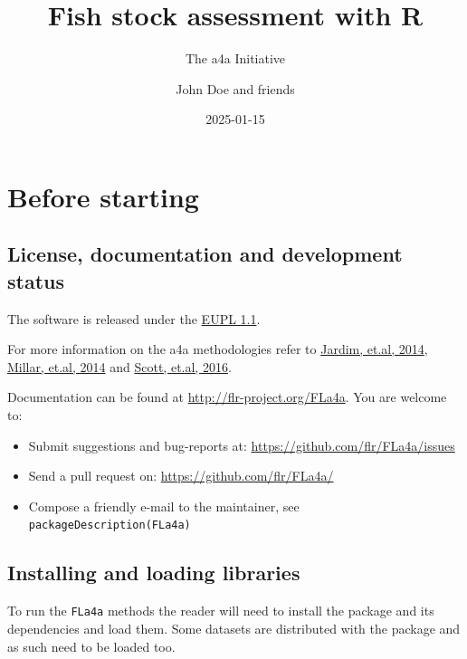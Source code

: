 \documentclass[
]{book}
\title{Fish stock assessment with R}
\subtitle{The a4a Initiative}
\author{John Doe and friends}
\date{2025-01-15}
\providecommand{\tightlist}{%
  \setlength{\itemsep}{0pt}\setlength{\parskip}{0pt}}
\begin{document}
\maketitle

{
\setcounter{tocdepth}{1}
\tableofcontents
}
\hypertarget{before-starting}{%
\chapter{Before starting}\label{before-starting}}

\hypertarget{license-documentation-and-development-status}{%
\section{License, documentation and development status}\label{license-documentation-and-development-status}}

The software is released under the \href{https://joinup.ec.europa.eu/community/eupl/home}{EUPL 1.1}.

For more information on the a4a methodologies refer to \href{http://icesjms.oxfordjournals.org/content/early/2014/04/03/icesjms.fsu050.abstract}{Jardim, et.al, 2014}, \href{http://icesjms.oxfordjournals.org/content/early/2014/03/31/icesjms.fsu043.abstract}{Millar, et.al, 2014} and \href{http://journals.plos.org/plosone/article?id=10.1371/journal.pone.0154922}{Scott, et.al, 2016}.

Documentation can be found at \url{http://flr-project.org/FLa4a}. You are welcome to:

\begin{itemize}
\tightlist
\item
  Submit suggestions and bug-reports at: \url{https://github.com/flr/FLa4a/issues}
\item
  Send a pull request on: \url{https://github.com/flr/FLa4a/}
\item
  Compose a friendly e-mail to the maintainer, see \texttt{packageDescription(\textquotesingle{}FLa4a\textquotesingle{})}
\end{itemize}

\hypertarget{installing-and-loading-libraries}{%
\section{Installing and loading libraries}\label{installing-and-loading-libraries}}

To run the \texttt{FLa4a} methods the reader will need to install the package and its dependencies and load them. Some datasets are distributed with the package and as such need to be loaded too.
\end{document}
